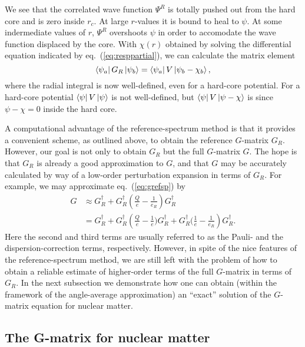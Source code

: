 We see that the correlated wave function $\Psi^R$ is totally pushed out
from the hard core and is zero inside $r_c$. At large $r$-values it is bound to
heal to $\psi$. At some indermediate values of $r$, $\Psi^R$ overshoots
$\psi$ in order to accomodate the wave function displaced by the core.
With $\chi (r)$ obtained by solving the differential equation
indicated by eq.\ (\ref{eq:resppartial}), we can calculate the
matrix element
\begin{equation}
    \left\langle \psi_a \right|G_R\left| \psi_b \right\rangle=\left\langle \psi_a \right|V\left| \psi_b-\chi_b \right\rangle,
\end{equation}
where the radial integral is now well-defined, even for a hard-core
potential. For a hard-core potential $\left\langle \psi \right|V\left| \psi \right\rangle$ is not
well-defined, but $\left\langle \psi \right|V\left| \psi -\chi \right\rangle$ is since $\psi -\chi=0$
inside the hard core.

A computational advantage of the reference-spectrum method is that it
provides a convenient scheme, as outlined above, to obtain the
reference $G$-matrix $G_R$. However, our goal is not only to obtain
$G_R$ but the full $G$-matrix $G$. The hope is that $G_R$ is already
a good approximation to $G$, and that $G$ may be accurately calculated
by way of a low-order perturbation expansion in terms of $G_R$. For example,
we may approximate eq.\ (\ref{eq:grefsp}) by
\begin{eqnarray}
  G&\approx {\displaystyle G_R^{\dagger}+
           G_R^{\dagger}\left(\frac{Q}{e}-\frac{1}{e_R}\right)
           G_R^{\dagger}}\nonumber \\
    &={\displaystyle G_R^{\dagger}+G_R^{\dagger}
           \left(\frac{Q}{e}-\frac{1}{e})G_R^{\dagger}+
           G_R^{\dagger}(\frac{1}{e}-\frac{1}{e_R}\right)G_R^{\dagger}}.
\end{eqnarray}
Here the second and third terms are usually referred to as the Pauli- and
the dispersion-correction terms, respectively.
However, in spite of the nice features of the reference-spectrum method,
we are still left with the problem of how to obtain a reliable
estimate of higher-order terms of the full $G$-matrix in terms
of $G_R$.
In the next subsection we demonstrate how one can obtain
(within the framework of the angle-average approximation) an ``exact''
solution of the $G$-matrix equation for nuclear matter.


\subsection{The G-matrix for nuclear matter}

